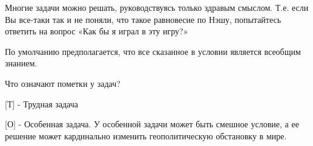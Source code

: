 Многие задачи можно решать, руководствуясь только здравым смыслом. Т.е. если Вы все-таки так и не поняли, что такое равновесие по Нэшу, попытайтесь ответить на вопрос «Как бы я играл в эту игру?»\par
По умолчанию предполагается, что все сказанное в условии является всеобщим знанием.\par

Что означают пометки у задач?\par
$[$Т$]$ - Трудная задача\par
$[$О$]$ - Особенная задача. У особенной задачи может быть смешное условие, а ее решение может кардинально изменить геополитическую обстановку в мире.










